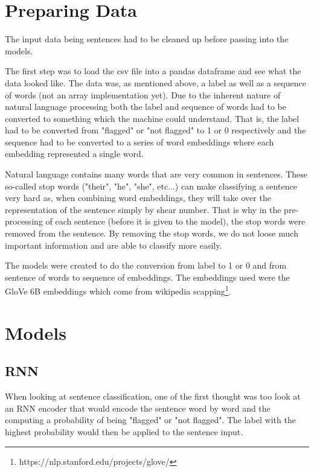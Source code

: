 \documentclass[twoside,twocolumn]{article}
\begin{document}
\section{Preparing Data}
The input data being sentences had to be cleaned up before passing into the models.

The first step was to load the csv file into a pandas dataframe and see what the data looked like.
The data was, as mentioned above, a label as well as a sequence of words (not an array implementation yet).
Due to the inherent nature of natural language processing both the label and sequence of words had to
be converted to something which the machine could understand. That is, the label had to be converted from 
"flagged" or "not flagged" to 1 or 0 respectively and the sequence had to be converted to a series of word
embeddings where each embedding represented a single word.

Natural language contains many words that are very common in sentences. These so-called stop words
 ("their", "he", "she", etc...) can make classifying a sentence very hard as, when combining word
 embeddings, they will take over the representation of the sentence simply by shear number. That is 
 why in the pre-processing of each sentence (before it is given to the model), the stop words were removed
 from the sentence. By removing the stop words, we do not loose much important information and
 are able to classify more easily.

The models were created to do the conversion from label to 1 or 0 and from sentence of words to sequence of embeddings.
The embeddings used were the GloVe 6B embeddings which come from wikipedia scapping\footnote{https://nlp.stanford.edu/projects/glove/}.


\section{Models}

\subsection{RNN}

When looking at sentence classification, one of the first thought was too look at an RNN encoder
that would encode the sentence word by word and the computing a probability of being "flagged"
or "not flagged". The label with the highest probability would then be applied to the sentence input.
\end{document}
